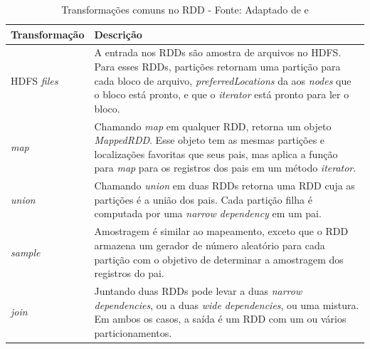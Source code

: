             \begin{table}[!ht]
            \begin{center}
              \begin{tabular}{|p{5cm}|p{10cm}|}
                \hline
                Transformação & Descrição
                \\ \hline
                HDFS \textit{files} & A entrada nos RDDs são amostra de arquivos no HDFS.  Para esses RDDs, partições retornam
                                                   uma partição para cada bloco de arquivo, \textit{preferredLocations} da aos \textit{nodes}
                                                   que o bloco está pronto, e que o \textit{iterator} está pronto para ler o bloco.
                \\ \hline
                \textit{map} & Chamando \textit{map} em qualquer RDD, retorna um objeto \textit{MappedRDD}. Esse objeto tem
                                          as mesmas partições e localizações favoritas que seus pais, mas aplica a função para \textit{map}
                                          para os registros dos pais em um método \textit{iterator}.
                \\ \hline
                \textit{union} & Chamando \textit{union} em duas RDDs retorna uma RDD cuja as partições é a união dos pais.
                                            Cada partição filha é computada por uma \textit{narrow dependency} em um pai.
                \\ \hline
                \textit{sample} & Amostragem é similar ao mapeamento, exceto que o RDD armazena um gerador de número
                                              aleatório para cada partição com o objetivo de determinar a amostragem dos registros do pai.
                \\ \hline
                \textit{join} & Juntando duas RDDs pode levar a duas \textit{narrow dependencies}, ou a duas \textit{wide dependencies},
                                        ou uma mistura. Em ambos os casos, a saída é um RDD com um ou vários particionamentos.
                \\ \hline
              \end{tabular}
              \caption[Transformações comuns no RDD]{Transformações comuns no RDD -
              \protect Fonte: Adaptado de  e }
            \label{tabela2}
            \end{center}
            \end{table}

